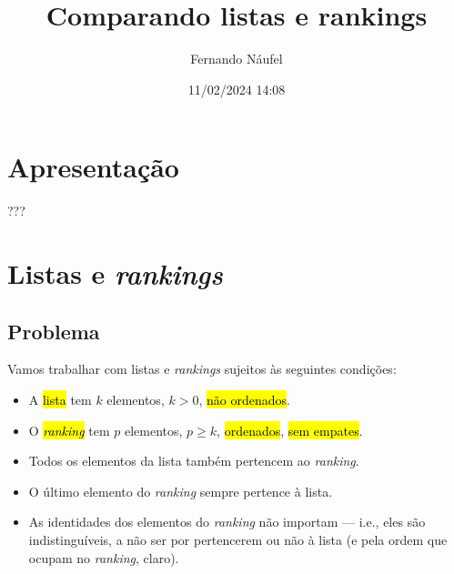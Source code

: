 \documentclass[
  letterpaper,
  DIV=11,
  numbers=noendperiod]{scrreprt}
\title{Comparando listas e rankings}
\author{Fernando Náufel}
\date{11/02/2024 14:08}
\renewcommand*\contentsname{Índice}
\newcommand\contentsname{Índice}
\begin{document}
\maketitle

\makeatletter
{}
{}
{}
\makeatother


\renewcommand*\contentsname{Índice}
{
\hypersetup{linkcolor=}
\setcounter{tocdepth}{2}
\tableofcontents
}

\chapter*{Apresentação}\label{apresentauxe7uxe3o}


???


\chapter{\texorpdfstring{Listas e
\emph{rankings}}{Listas e rankings}}\label{listas-e-rankings}

\section{Problema}\label{problema}

Vamos trabalhar com listas e \emph{rankings} sujeitos às seguintes
condições:

\begin{itemize}
\item
  A {\hl{lista}} tem $k$ elementos, $k > 0$, {\hl{não ordenados}}.
\item
  O {\hl{\emph{ranking}}} tem $p$ elementos, $p \geq k$,
  {\hl{ordenados}}, {\hl{sem empates}}.
\item
  Todos os elementos da lista também pertencem ao \emph{ranking}.
\item
  O último elemento do \emph{ranking} sempre pertence à lista.
\item
  As identidades dos elementos do \emph{ranking} não importam --- i.e.,
  eles são indistinguíveis, a não ser por pertencerem ou não à lista (e
  pela ordem que ocupam no \emph{ranking}, claro).
\end{itemize}
\end{document}
